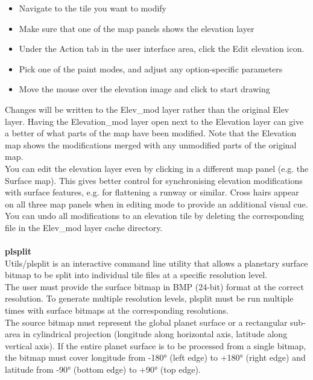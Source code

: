 \documentclass[Orbiter Developer Manual.tex]{subfiles}
\begin{document}
\begin{itemize}
\item Navigate to the tile you want to modify
\item Make sure that one of the map panels shows the elevation layer
\item Under the Action tab in the user interface area, click the Edit elevation icon.
\item Pick one of the paint modes, and adjust any option-specific parameters
\item Move the mouse over the elevation image and click to start drawing
\end{itemize}

\noindent
Changes will be written to the Elev\_mod layer rather than the original Elev layer. Having the Elevation\_mod layer open next to the Elevation layer can give a better of what parts of the map have been modified. Note that the Elevation map shows the modifications merged with any unmodified parts of the original map.\\
You can edit the elevation layer even by clicking in a different map panel (e.g. the Surface map). This gives better control for synchronising elevation modifications with surface features, e.g. for flattening a runway or similar. Cross hairs appear on all three map panels when in editing mode to provide an additional visual cue.\\
You can undo all modifications to an elevation tile by deleting the corresponding file in the Elev\_mod layer cache directory.\\
\\
\textbf{plsplit}\\
Utils/plsplit is an interactive command line utility that allows a planetary surface bitmap to be split into individual tile files at a specific resolution level.\\
The user must provide the surface bitmap in BMP (24-bit) format at the correct resolution. To generate multiple resolution levels, plsplit must be run multiple times with surface bitmaps at the corresponding resolutions.\\
The source bitmap must represent the global planet surface or a rectangular sub-area in cylindrical projection (longitude along horizontal axis, latitude along vertical axis). If the entire planet surface is to be processed from a single bitmap, the bitmap must cover longitude from -180° (left edge) to +180° (right edge) and latitude from -90° (bottom edge) to +90° (top edge).\\
\end{document}
